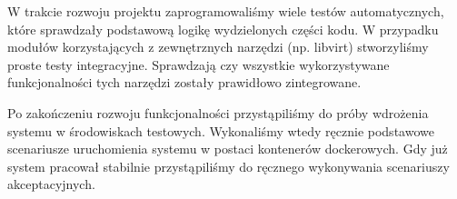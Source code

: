 \documentclass[../analiza-rozwiazania.tex]{subfiles}
\begin{document}
W trakcie rozwoju projektu zaprogramowaliśmy wiele testów automatycznych, które sprawdzały podstawową logikę wydzielonych części kodu.
W przypadku modułów korzystających z zewnętrznych narzędzi (np. libvirt) stworzyliśmy proste testy integracyjne.
Sprawdzają czy wszystkie wykorzystywane funkcjonalności tych narzędzi zostały prawidłowo zintegrowane.

Po zakończeniu rozwoju funkcjonalności przystąpiliśmy do próby wdrożenia systemu w środowiskach testowych.
Wykonaliśmy wtedy ręcznie podstawowe scenariusze uruchomienia systemu w postaci kontenerów dockerowych.
Gdy już system pracował stabilnie przystąpiliśmy do ręcznego wykonywania scenariuszy akceptacyjnych.
\end{document}

